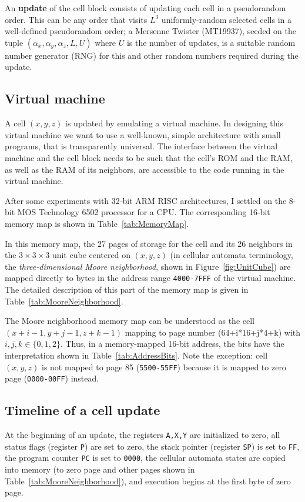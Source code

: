 \documentclass{article}
\newcommand\code[1]{{\tt #1}}
\newcommand\hex[1]{{\tt #1}}
\newcommand\hexrange[2]{\hex{#1}{\tt -}\hex{#2}}
\begin{document}
An {\bf update} of the cell block consists of updating each cell in a pseudorandom order.
This can be any order that visits $L^3$ uniformly-random selected cells in a well-defined pseudorandom order;
a Mersenne Twister (MT19937),
seeded on the tuple $(\alpha_x,\alpha_y,\alpha_z,L,U)$ where $U$ is the number of updates,
is a suitable random number generator (RNG) for this and other random numbers required during the update.

\subsection{Virtual machine}

A cell $(x,y,z)$ is updated by emulating a virtual machine.
In designing this virtual machine we want to use a well-known, simple architecture with small programs,
that is transparently universal.
The interface between the virtual machine and the cell block
needs to be such that the cell's ROM and the RAM, as well as the RAM of its neighbors,
are accessible to the code running in the virtual machine.

After some experiments with 32-bit ARM RISC architectures,
I settled on the 8-bit MOS Technology 6502 processor for a CPU.
The corresponding 16-bit memory map is shown in Table~\ref{tab:MemoryMap}.

In this memory map, the 27 pages of storage
for the cell and its 26 neighbors
in the $3 \times 3 \times 3$ unit cube centered on $(x,y,z)$
(in cellular automata terminology, the {\em three-dimensional Moore neighborhood}, shown in Figure~\ref{fig:UnitCube})
are mapped directly to bytes in the address range \hexrange{4000}{7FFF} of the virtual machine.
The detailed description of this part of the memory map
is given in Table~\ref{tab:MooreNeighborhood}.

The Moore neighborhood memory map can be understood as the cell $(x+i-1,y+j-1,z+k-1)$
mapping to page number (64+i*16+j*4+k) with $i,j,k \in \{0,1,2\}$.
Thus, in a memory-mapped 16-bit address, the bits have the interpretation shown in Table~\ref{tab:AddressBits}.
Note the exception: cell $(x,y,z)$ is not mapped to page 85 (\hexrange{5500}{55FF})
because it is mapped to zero page (\hexrange{0000}{00FF}) instead.

\subsection{Timeline of a cell update}
\label{sec:Timeline}

At the beginning of an update,
the registers \code{A,X,Y} are initialized to zero,
all status flags (register \code{P}) are set to zero,
the stack pointer (register \code{SP}) is set to \hex{FF},
the program counter \code{PC} is set to \hex{0000},
the cellular automata states are copied into memory (to zero page and other pages shown in Table~\ref{tab:MooreNeighborhood}),
and execution begins at the first byte of zero page.
\end{document}

